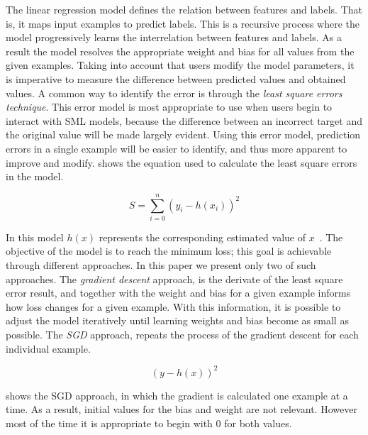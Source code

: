 The linear regression model defines the relation between features and labels. That is, it maps 
input examples to predict labels. This is a recursive process where the model progressively learns 
the interrelation between features and labels. As a result the model resolves the appropriate weight 
and bias for all values from the given examples. 
Taking into account that users modify the model parameters, it is imperative to measure the difference 
between predicted values and obtained values.  A common way to identify the error is through the 
\emph{least square errors technique}. This error model is most appropriate to use when users begin 
to interact with \ac{SML} models, because the difference between an incorrect target and the original 
value will be made largely evident. Using this error model,  prediction errors in a single example will 
be easier to identify, and thus more apparent to improve and modify.  shows 
the equation used to calculate the least square errors in the model.

\begin{equation} \label{eq:L2loss equation}
\displaystyle
S = \sum_{i=0}^n (y_i - h(x_i))^2
\end{equation}

In this model $h(x)$ represents the corresponding estimated value of $x$~\cite{rish15}.
The objective of the model is to reach the minimum loss; this goal is achievable through different 
approaches. In this paper we present only two of such approaches. The \emph{gradient descent} 
approach, is the derivate of the least square error result, and together with the weight and bias for a 
given example informs how loss changes for a given example. With this information, it is possible to 
adjust the model iteratively until learning weights and bias become as small as possible. 
The \emph{\ac{SGD}} approach, repeats the process of the gradient descent for each individual 
example.

\begin{equation} \label{eq:SGD}
(y - h(x))^2
\end{equation}

 shows the \ac{SGD} approach, in which the gradient is calculated one example at a 
time. As a result, initial values for the bias and weight are not relevant. However most of the time it is 
appropriate to begin with $0$ for both values.


